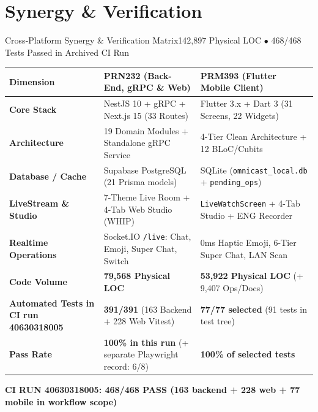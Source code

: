 \documentclass[aspectratio=169,10pt]{beamer}
\begin{document}
\section{Synergy \& Verification}
\begin{frame}{Cross-Platform Synergy \& Verification Matrix}{142,897 Physical LOC $\bullet$ 468/468 Tests Passed in Archived CI Run}
  \begin{center}
  \footnotesize
  \renewcommand{\arraystretch}{1.18}
  \begin{tabularx}{0.96\linewidth}{lXX}
    \toprule
    \textbf{Dimension} & \textbf{\color{omniCyan}PRN232 (Back-End, gRPC \& Web)} & \textbf{\color{omniPurple}PRM393 (Flutter Mobile Client)} \\
    \midrule
    \textbf{Core Stack} & NestJS 10 + gRPC + Next.js 15 (33 Routes) & Flutter 3.x + Dart 3 (31 Screens, 22 Widgets) \\
    \textbf{Architecture} & 19 Domain Modules + Standalone gRPC Service & 4-Tier Clean Architecture + 12 BLoC/Cubits \\
    \textbf{Database / Cache} & Supabase PostgreSQL (21 Prisma models) & SQLite (\texttt{omnicast\_local.db} + \texttt{pending\_ops}) \\
    \textbf{LiveStream \& Studio} & 7-Theme Live Room + 4-Tab Web Studio (WHIP) & \texttt{LiveWatchScreen} + 4-Tab Studio + ENG Recorder \\
    \textbf{Realtime Operations} & Socket.IO \texttt{/live}: Chat, Emoji, Super Chat, Switch & 0ms Haptic Emoji, 6-Tier Super Chat, LAN Scan \\
    \textbf{Code Volume} & \textbf{79,568 Physical LOC} & \textbf{53,922 Physical LOC} (+ 9,407 Ops/Docs) \\
    \textbf{Automated Tests in CI run 40630318005} & \textbf{391/391} (163 Backend + 228 Web Vitest) & \textbf{77/77 selected} (91 tests in test tree) \\
    \textbf{Pass Rate} & \textbf{\color{omniGreen}100\% in this run} (+ separate Playwright record: 6/8) & \textbf{\color{omniGreen}100\% of selected tests} \\
    \bottomrule
  \end{tabularx}
  \end{center}
  \vspace*{-1mm}
  \begin{center}
    \scriptsize\color{omniGreen}\textbf{CI RUN 40630318005: 468/468 PASS (163 backend + 228 web + 77 mobile in workflow scope)}
  \end{center}
\end{frame}
\end{document}
